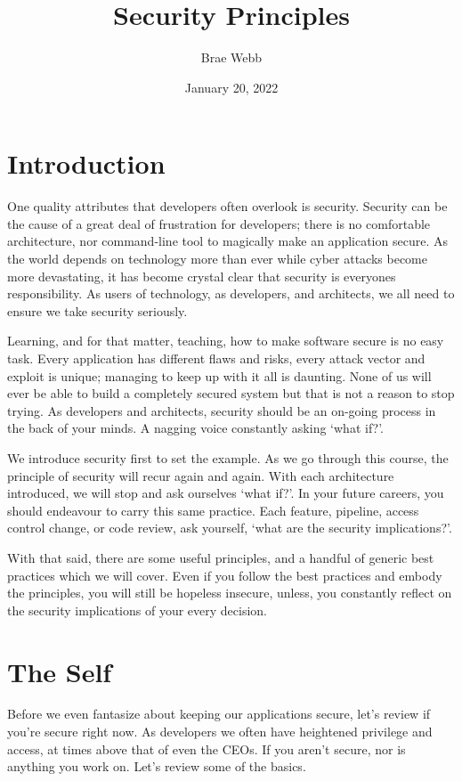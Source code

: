 \documentclass{csse4400}
\title{Security Principles}
\author{Brae Webb}
\date{January 20, 2022}
\begin{document}
\makecover

\maketitle

\section{Introduction}

One quality attributes that developers often overlook is security.
Security can be the cause of a great deal of frustration for developers;
there is no comfortable architecture, nor command-line tool to magically make an application secure.
As the world depends on technology more than ever while cyber attacks become more devastating,
it has become crystal clear that security is everyones responsibility.
As users of technology, as developers, and architects, we all need to ensure we take security seriously.

Learning, and for that matter, teaching, how to make software secure is no easy task.
Every application has different flaws and risks, every attack vector and exploit is unique; managing to keep up with it all is daunting.
None of us will ever be able to build a completely secured system but that is not a reason to stop trying.
As developers and architects, security should be an on-going process in the back of your minds.
A nagging voice constantly asking `what if?'.

We introduce security first to set the example.
As we go through this course, the principle of security will recur again and again.
With each architecture introduced, we will stop and ask ourselves `what if?'.
In your future careers, you should endeavour to carry this same practice.
Each feature, pipeline, access control change, or code review, ask yourself, `what are the security implications?'.

With that said, there are some useful principles, and a handful of generic best practices which we will cover.
Even if you follow the best practices and embody the principles,
you will still be hopeless insecure, unless, you constantly reflect on the security implications of your every decision.

\section{The Self}
Before we even fantasize about keeping our applications secure, let's review if you're secure right now.
As developers we often have heightened privilege and access, at times above that of even the CEOs.
If you aren't secure, nor is anything you work on.
Let's review some of the basics.
\end{document}
